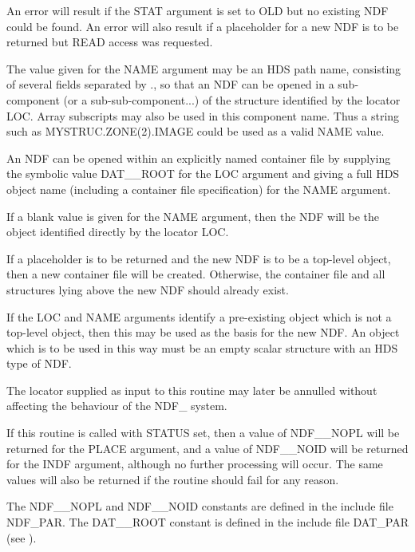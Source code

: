{{{         \sstitem
         An error will result if the STAT argument is set to OLD but
         no existing NDF could be found. An error will also result if a
         placeholder for a new NDF is to be returned but READ access was
         requested.

         \sstitem
         The value given for the NAME argument may be an HDS path name,
         consisting of several fields separated by ., so that an NDF can
         be opened in a sub-component (or a sub-sub-component...) of the
         structure identified by the locator LOC.  Array subscripts may
         also be used in this component name.  Thus a string such as
         MYSTRUC.ZONE(2).IMAGE could be used as a valid NAME value.

         \sstitem
         An NDF can be opened within an explicitly named container file
         by supplying the symbolic value DAT\_\_ROOT for the LOC argument
         and giving a full HDS object name (including a container file
         specification) for the NAME argument.

         \sstitem
         If a blank value is given for the NAME argument, then the
         NDF will be the object identified directly by the locator LOC.

         \sstitem
         If a placeholder is to be returned and the new NDF is to be a
         top-level object, then a new container file will be created.
         Otherwise, the container file and all structures lying above the
         new NDF should already exist.

         \sstitem
         If the LOC and NAME arguments identify a pre-existing object
         which is not a top-level object, then this may be used as the
         basis for the new NDF. An object which is to be used in this way
         must be an empty scalar structure with an HDS type of NDF.

         \sstitem
         The locator supplied as input to this routine may later be
         annulled without affecting the behaviour of the NDF\_ system.

         \sstitem
         If this routine is called with STATUS set, then a value of
         NDF\_\_NOPL will be returned for the PLACE argument, and a value of
         NDF\_\_NOID will be returned for the INDF argument, although no
         further processing will occur. The same values will also be
         returned if the routine should fail for any reason.

         \sstitem
         The NDF\_\_NOPL and NDF\_\_NOID constants are defined in the
         include file NDF\_PAR. The DAT\_\_ROOT constant is defined in the
         include file DAT\_PAR (see ).
      }
   }
}

